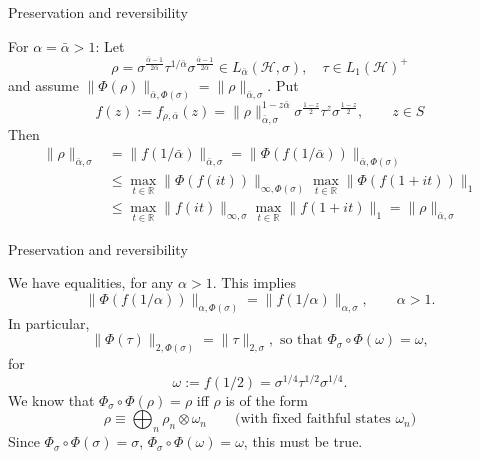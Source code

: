 \documentclass[mathserif]{beamer}
\newcommand{\<}{\langle}
\renewcommand{\>}{\rangle}
\newcommand{\Ha}{\mathcal H}
\begin{document}
\begin{frame}{Preservation and reversibility}

For  $\alpha=\bar \alpha>1$: Let
\[
\rho=\sigma^{\frac{\bar\alpha-1}{2\bar\alpha}}\tau^{1/\bar\alpha}\sigma^{\frac{\bar\alpha-1}{2\bar\alpha}}\in
L_{\bar\alpha}(\Ha,\sigma), \quad \tau\in L_1(\Ha)^+
\]
and assume $\|\Phi(\rho)\|_{\bar{\alpha},\Phi(\sigma)}=\|\rho\|_{\bar\alpha,\sigma}$. 
Put
\[
f(z):=f_{\rho,\bar\alpha}(z)=
\|\rho\|_{\bar\alpha,\sigma}^{1-z\bar\alpha}\sigma^{\frac{1-z}2}\tau^{z}\sigma^{\frac{1-z}2},\qquad
z\in S
\]
Then
\begin{align*}
\|\rho\|_{\bar\alpha,\sigma}&=\|f(1/\bar\alpha)\|_{\bar\alpha,\sigma}=\|\Phi(f(1/\bar\alpha))\|_{\bar\alpha,\Phi(\sigma)}\\
&\le 
\max_{t\in \mathbb R}
\|\Phi(f(it))\|_{\infty,\Phi(\sigma)}\max_{t\in \mathbb R}\|\Phi(f(1+it))\|_1\\
&\le \max_{t\in \mathbb R}
\|f(it)\|_{\infty,\sigma}\max_{t\in \mathbb R}\|f(1+it)\|_1=\|\rho\|_{\bar\alpha,\sigma}
\end{align*}





\end{frame}


\begin{frame}{Preservation and reversibility}

We have equalities, for any $\alpha>1$. This implies
\[
\|\Phi(f(1/\alpha))\|_{\alpha,\Phi(\sigma)}=\|f(1/\alpha)\|_{\alpha,\sigma},\qquad
\alpha>1.
\]
In particular, 
\[
\|\Phi(\tau)\|_{2,\Phi(\sigma)}=\|\tau\|_{2,\sigma}, \text{ so that }
\Phi_\sigma\circ\Phi(\omega)=\omega,
\]
for
\[
\omega:=f(1/2)=
\sigma^{1/4}\tau^{1/2}\sigma^{1/4}.
\]
We know that $\Phi_\sigma\circ\Phi(\rho)=\rho$ iff $\rho$ is of the form
\[
\rho\equiv \bigoplus_n \rho_n\otimes \omega_n\qquad \text{(with fixed faithful states $\omega_n$)}
\]
Since  $\Phi_\sigma\circ\Phi(\sigma)=\sigma$, $\Phi_\sigma\circ\Phi(\omega)=\omega$, this
must be true.


\end{frame}
\end{document}
